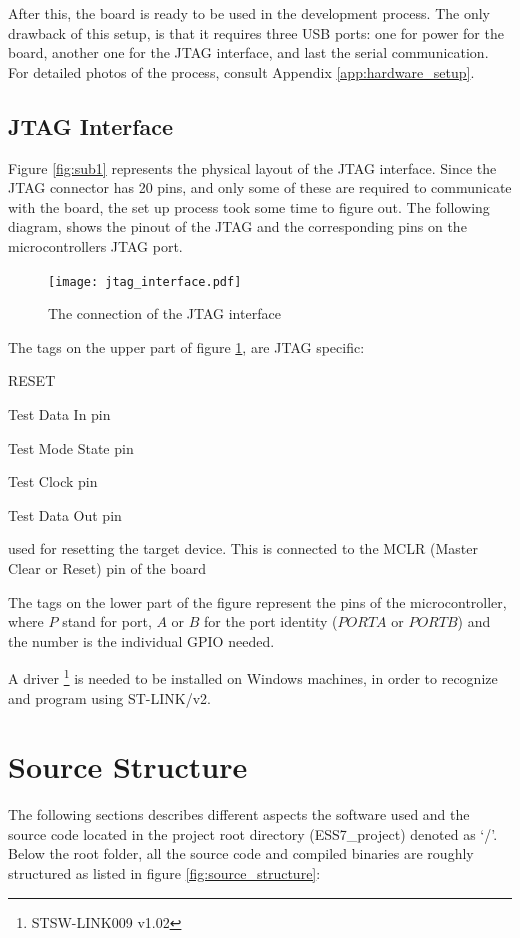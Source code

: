 After this, the board is ready to be used in the development process.
The only drawback of this setup, is that it requires three USB ports:
one for power for the board, another one for the JTAG interface, and last
the serial communication. For detailed photos of the process, consult
Appendix \ref{app:hardware_setup}.

\subsection{JTAG Interface}
\label{ssec:JTAG_Interface}
Figure \ref{fig:sub1} represents the physical layout of the JTAG interface.
Since the JTAG connector has 20 pins, and only some of these are required
to communicate with the board, the set up process took some time to figure
out. The following diagram, shows the pinout of the JTAG and the 
corresponding pins on the microcontroller\textquotesingle s JTAG port.

\begin{figure}[H]
\centering
\texttt{[image: jtag\_interface.pdf]}
\caption{The connection of the JTAG interface}
\label{fig:jtag_interface}
\end{figure}

The tags on the upper part of figure \ref{fig:jtag_interface}, are
JTAG specific:
\begin{labeling}{RESET}
	\item [\textbf{TDI}]
		Test Data In pin
	\item [\textbf{TMS}]
		Test Mode State pin
	\item [\textbf{TCK}]
		Test Clock pin
	\item [\textbf{TDO}]
		Test Data Out pin
	\item [\textbf{RESET}]
		used for resetting the target device. This is connected to the 
		MCLR (Master Clear or Reset) pin of the board
\end{labeling}

The tags on the lower part of the figure represent the pins of the 
microcontroller, where $P$ stand for port, $A$ or $B$ for the port
identity ($PORTA$ or $PORTB$) and the number is the individual GPIO needed.

A driver \footnote{STSW-LINK009 v1.02} 
is needed to be installed on Windows machines, in order to
recognize and program using ST-LINK/v2.

\section{Source Structure}
The following sections describes different aspects the software used and
the source code located in the project root directory (ESS7\_project) denoted as `/'.
Below the root folder,
all the source code and compiled binaries are roughly structured as listed
in figure \ref{fig:source_structure}:

